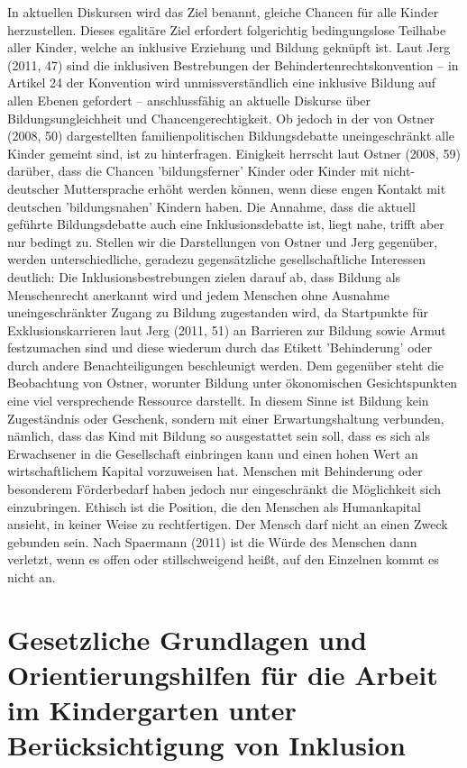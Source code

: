 In aktuellen Diskursen wird das Ziel benannt, gleiche Chancen für alle Kinder herzustellen. Dieses egalitäre Ziel erfordert folgerichtig bedingungslose Teilhabe aller Kinder, welche an inklusive Erziehung und Bildung geknüpft ist. Laut Jerg (2011, 47) sind die inklusiven Bestrebungen der Behindertenrechtskonvention – in Artikel 24 der Konvention wird unmissverständlich eine inklusive Bildung auf allen Ebenen gefordert – anschlussfähig an aktuelle Diskurse über Bildungsungleichheit und Chancengerechtigkeit. Ob jedoch in der von Ostner (2008, 50) dargestellten familienpolitischen Bildungsdebatte uneingeschränkt alle Kinder gemeint sind, ist zu hinterfragen. Einigkeit herrscht laut Ostner (2008, 59) darüber, dass die Chancen 'bildungsferner' Kinder oder Kinder mit nicht-deutscher Muttersprache erhöht werden können, wenn diese engen Kontakt mit deutschen 'bildungsnahen' Kindern haben. Die Annahme, dass die aktuell geführte Bildungsdebatte auch eine Inklusionsdebatte ist, liegt nahe, trifft aber nur bedingt zu. Stellen wir die Darstellungen von Ostner und Jerg gegenüber, werden unterschiedliche, geradezu gegensätzliche gesellschaftliche Interessen deutlich: Die Inklusionsbestrebungen zielen darauf ab, dass Bildung als Menschenrecht anerkannt wird und jedem Menschen ohne Ausnahme uneingeschränkter Zugang zu Bildung zugestanden wird, da Startpunkte für Exklusionskarrieren laut Jerg (2011, 51) an Barrieren zur Bildung sowie Armut festzumachen sind und diese wiederum durch das Etikett 'Behinderung' oder durch andere Benachteiligungen beschleunigt werden.  Dem gegenüber steht die Beobachtung von Ostner, worunter Bildung unter ökonomischen Gesichtspunkten eine viel versprechende Ressource darstellt. In diesem Sinne ist Bildung kein Zugeständnis oder Geschenk, sondern mit einer Erwartungshaltung verbunden, nämlich, dass das Kind mit Bildung so ausgestattet sein soll, dass es sich als Erwachsener in die Gesellschaft einbringen kann und einen hohen Wert an wirtschaftlichem Kapital vorzuweisen hat. Menschen mit Behinderung oder besonderem Förderbedarf haben jedoch nur eingeschränkt die Möglichkeit sich einzubringen. 
Ethisch ist die Position, die den Menschen als Humankapital ansieht, in keiner Weise zu rechtfertigen. Der Mensch darf nicht an einen Zweck gebunden sein. Nach Spaermann (2011) ist die Würde des Menschen dann verletzt, wenn es offen oder stillschweigend heißt, auf den Einzelnen kommt es nicht an. 

\section{Gesetzliche Grundlagen und Orientierungshilfen für die Arbeit im Kindergarten unter Berücksichtigung von Inklusion}

